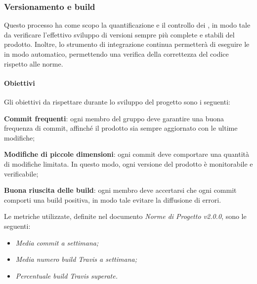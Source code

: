 \subsubsection{Versionamento e build} 
Questo processo ha come scopo la quantificazione e il controllo dei , in modo tale da verificare l'effettivo sviluppo di versioni sempre più complete e stabili del prodotto. Inoltre, lo strumento di integrazione continua  permetterà di eseguire le  in modo automatico, permettendo una verifica della correttezza del codice rispetto alle norme.
\paragraph{Obiettivi} \Spazio
Gli obiettivi da rispettare durante lo sviluppo del progetto sono i seguenti:
\begin{itemize}
	\item{\textbf{Commit frequenti}: ogni membro del gruppo deve garantire una buona frequenza di commit, affinché il prodotto sia sempre aggiornato con le ultime modifiche;
	\item{\textbf{Modifiche di piccole dimensioni}: ogni commit deve comportare una quantità di modifiche limitata. In questo modo, ogni versione del prodotto è monitorabile e verificabile;}
	\item{\textbf{Buona riuscita delle build}: ogni membro deve accertarsi che ogni commit comporti una build positiva, in modo tale evitare la diffusione di errori.}
	}
\end{itemize}
Le metriche utilizzate, definite nel documento \emph{Norme di Progetto v2.0.0}, sono le seguenti:
\begin{itemize}
	\item\emph{Media commit a settimana;}
	\item\emph{Media numero build Travis a settimana;}
	\item\emph{Percentuale build Travis superate.}
\end{itemize}

